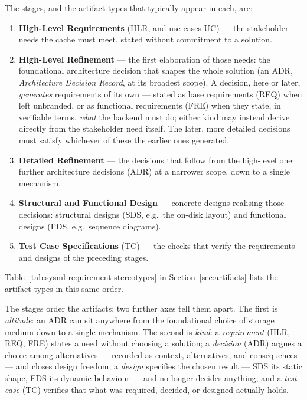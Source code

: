 The stages, and the artifact types that typically appear in each, are:
\begin{enumerate}
  \item \textbf{High-Level Requirements} (\textsf{HLR}, and use cases
        \textsf{UC}) --- the stakeholder needs the cache must meet, stated without
        commitment to a solution.
  \item \textbf{High-Level Refinement} --- the first elaboration of those needs:
        the foundational architecture decision that shapes the whole solution
        (an \textsf{ADR}, \emph{Architecture Decision Record}, at its broadest
        scope). A decision, here or later, \emph{generates} requirements of its
        own --- stated as base requirements (\textsf{REQ}) when left unbranded,
        or as functional requirements (\textsf{FRE}) when they state, in
        verifiable terms, \emph{what} the backend must do; either kind may
        instead derive directly from the stakeholder need itself. The later,
        more detailed decisions must satisfy whichever of these the earlier
        ones generated.
  \item \textbf{Detailed Refinement} --- the decisions that follow from the
        high-level one: further architecture decisions (\textsf{ADR}) at a
        narrower scope, down to a single mechanism.
  \item \textbf{Structural and Functional Design} --- concrete designs realising
        those decisions: structural designs (\textsf{SDS}, e.g.\ the on-disk
        layout) and functional designs (\textsf{FDS}, e.g.\ sequence diagrams).
  \item \textbf{Test Case Specifications} (\textsf{TC}) --- the checks that verify
        the requirements and designs of the preceding stages.
\end{enumerate}
Table~\ref{tab:sysml-requirement-stereotypes} in Section~\ref{sec:artifacts}
lists the artifact types in this same order.

The stages order the artifacts; two further axes tell them apart. The first is
\emph{altitude}: an \textsf{ADR} can sit anywhere from the foundational choice
of storage medium down to a single mechanism.
The second is \emph{kind}: a \emph{requirement} (\textsf{HLR}, \textsf{REQ},
\textsf{FRE}) states a need without choosing a solution; a \emph{decision}
(\textsf{ADR}) argues a choice among alternatives
--- recorded as context, alternatives, and consequences --- and closes design
freedom; a \emph{design} specifies the chosen result --- \textsf{SDS} its
static shape, \textsf{FDS} its dynamic behaviour --- and no longer decides
anything; and a \emph{test case} (\textsf{TC}) verifies that what was
required, decided, or designed actually holds.

